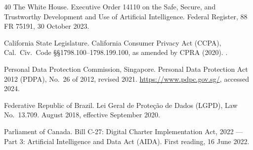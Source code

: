 \documentclass[11pt,twocolumn]{article}
\begin{document}
\begin{thebibliography}{40}
The White House.
\newblock Executive Order 14110 on the Safe, Secure, and Trustworthy
  Development and Use of Artificial Intelligence.
\newblock Federal Register, 88 FR 75191, 30 October 2023.

California State Legislature.
\newblock California Consumer Privacy Act (CCPA), Cal.\ Civ.\ Code
  \S\S 1798.100--1798.199.100, as amended by CPRA (2020).
.

Personal Data Protection Commission, Singapore.
\newblock Personal Data Protection Act 2012 (PDPA), No.~26 of 2012, revised
  2021.
\newblock \url{https://www.pdpc.gov.sg/}, accessed 2024.

Federative Republic of Brazil.
\newblock Lei Geral de Prote{\c{c}}{\~a}o de Dados (LGPD), Law No.~13.709.
 August 2018, effective September 2020.

Parliament of Canada.
\newblock Bill C-27: Digital Charter Implementation Act, 2022 --- Part 3:
  Artificial Intelligence and Data Act (AIDA).
\newblock First reading, 16 June 2022.

\end{thebibliography}
\end{document}
